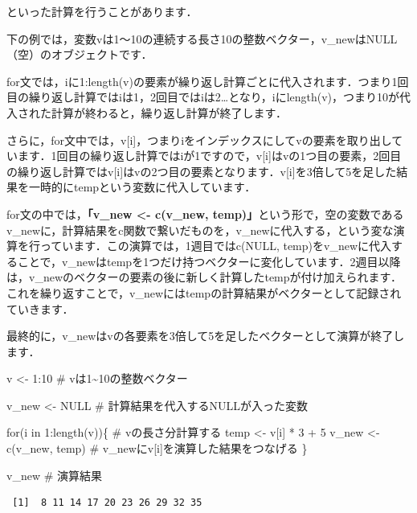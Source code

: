 \documentclass[
  letterpaper,
  DIV=11,
  numbers=noendperiod]{scrreprt}
\newenvironment{Shaded}{\begin{snugshade}}{\end{snugshade}}
\newcommand{\CommentTok}[1]{\textcolor[rgb]{0.37,0.37,0.37}{#1}}
\newcommand{\ConstantTok}[1]{\textcolor[rgb]{0.56,0.35,0.01}{#1}}
\newcommand{\ControlFlowTok}[1]{\textcolor[rgb]{0.00,0.23,0.31}{#1}}
\newcommand{\DecValTok}[1]{\textcolor[rgb]{0.68,0.00,0.00}{#1}}
\newcommand{\FunctionTok}[1]{\textcolor[rgb]{0.28,0.35,0.67}{#1}}
\newcommand{\NormalTok}[1]{\textcolor[rgb]{0.00,0.23,0.31}{#1}}
\newcommand{\OtherTok}[1]{\textcolor[rgb]{0.00,0.23,0.31}{#1}}
\newcommand{\SpecialCharTok}[1]{\textcolor[rgb]{0.37,0.37,0.37}{#1}}
\begin{document}
といった計算を行うことがあります．

下の例では，変数vは1～10の連続する長さ10の整数ベクター，v\_newはNULL（空）のオブジェクトです．

for文では，iに1:length(v)の要素が繰り返し計算ごとに代入されます．つまり1回目の繰り返し計算ではiは1，2回目ではiは2\ldots となり，iにlength(v)，つまり10が代入された計算が終わると，繰り返し計算が終了します．

さらに，for文中では，v{[}i{]}，つまりiをインデックスにしてvの要素を取り出しています．1回目の繰り返し計算ではiが1ですので，v{[}i{]}はvの1つ目の要素，2回目の繰り返し計算ではv{[}i{]}はvの2つ目の要素となります．v{[}i{]}を3倍して5を足した結果を一時的にtempという変数に代入しています．

for文の中では，\textbf{「v\_new \textless- c(v\_new,
temp)」}という形で，空の変数であるv\_newに，計算結果をc関数で繋いだものを，v\_newに代入する，という変な演算を行っています．この演算では，1週目ではc(NULL,
temp)をv\_newに代入することで，v\_newはtempを1つだけ持つベクターに変化しています．2週目以降は，v\_newのベクターの要素の後に新しく計算したtempが付け加えられます．これを繰り返すことで，v\_newにはtempの計算結果がベクターとして記録されていきます．

最終的に，v\_newはvの各要素を3倍して5を足したベクターとして演算が終了します．

\begin{Shaded}
\begin{Highlighting}[]
\NormalTok{v }\OtherTok{\textless{}{-}} \DecValTok{1}\SpecialCharTok{:}\DecValTok{10} \CommentTok{\# vは1\textasciitilde{}10の整数ベクター}

\NormalTok{v\_new }\OtherTok{\textless{}{-}} \ConstantTok{NULL} \CommentTok{\# 計算結果を代入するNULLが入った変数}

\ControlFlowTok{for}\NormalTok{(i }\ControlFlowTok{in} \DecValTok{1}\SpecialCharTok{:}\FunctionTok{length}\NormalTok{(v))\{ }\CommentTok{\# vの長さ分計算する}
\NormalTok{  temp }\OtherTok{\textless{}{-}}\NormalTok{ v[i] }\SpecialCharTok{*} \DecValTok{3} \SpecialCharTok{+} \DecValTok{5}
\NormalTok{  v\_new }\OtherTok{\textless{}{-}} \FunctionTok{c}\NormalTok{(v\_new, temp) }\CommentTok{\# v\_newにv[i]を演算した結果をつなげる}
\NormalTok{\}}

\NormalTok{v\_new }\CommentTok{\# 演算結果}
\end{Highlighting}
\end{Shaded}

\begin{verbatim}
 [1]  8 11 14 17 20 23 26 29 32 35
\end{verbatim}
\end{document}
